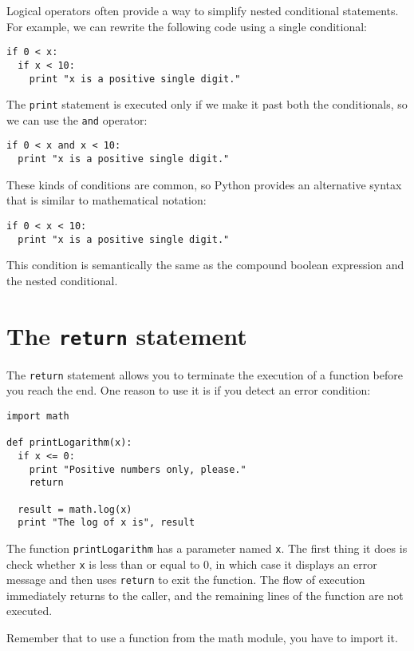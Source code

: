 Logical operators often provide a way to simplify nested conditional
statements.  For example, we can rewrite the following code using a
single conditional:

\beforeverb
\begin{verbatim}
if 0 < x:
  if x < 10:
    print "x is a positive single digit."
\end{verbatim}
\afterverb
%
The {\tt print} statement is executed only if we make it past both the
conditionals, so we can use the {\tt and} operator:

\beforeverb
\begin{verbatim}
if 0 < x and x < 10:
  print "x is a positive single digit."
\end{verbatim}
\afterverb
%
These kinds of conditions are common, so Python provides an
alternative syntax that is similar to mathematical notation:

\beforeverb
\begin{verbatim}
if 0 < x < 10:
  print "x is a positive single digit."
\end{verbatim}
\afterverb
%
This condition is semantically the same as
the compound boolean expression and the nested conditional.


\section{The {\tt return} statement}

The {\tt return} statement allows you to terminate the execution of a
function before you reach the end.  One reason to use it is if you
detect an error condition:

\beforeverb
\begin{verbatim}
import math

def printLogarithm(x):
  if x <= 0:
    print "Positive numbers only, please."
    return

  result = math.log(x)
  print "The log of x is", result
\end{verbatim}
\afterverb
%
The function {\tt printLogarithm} has a
parameter named {\tt x}.  The first thing it does is check whether
{\tt x} is less than or equal to 0, in which case it displays an
error message and then uses {\tt return} to exit the function. The
flow of execution immediately returns to the caller, and the remaining
lines of the function are not executed.

Remember that to use a function from the math
module, you have to import it.


